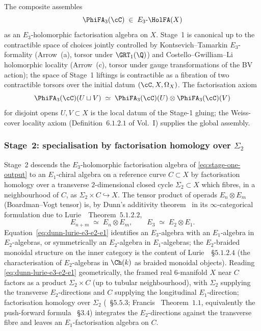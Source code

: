 The composite assembles
\begin{equation}
\label{eq:stage-one-output}
 \PhiFA_3(\cC) \;\in\; E_3\text{-}\HolFA(X)
\end{equation}
as an $E_3$-holomorphic factorisation algebra on $X$. Stage~1 is
canonical up to the contractible space of choices jointly controlled
by Kontsevich--Tamarkin $E_3$-formality (Arrow~(a), torsor under
$\GRT_1(\Q)$) and Costello--Gwilliam--Li holomorphic locality
(Arrow~(c), torsor under gauge transformations of the BV action); the
space of Stage~1 liftings is contractible as a fibration of two
contractible torsors over the initial datum $(\cC, X, \Omega_X)$. The
factorisation axiom
\begin{equation}
\label{eq:stage-one-factorisation}
 \PhiFA_3(\cC)(U \sqcup V) \;\simeq\;
 \PhiFA_3(\cC)(U) \otimes \PhiFA_3(\cC)(V)
\end{equation}
for disjoint opens $U, V \subset X$ is the local datum of the Stage-1
gluing; the Weiss-cover locality axiom (Definition~$6.1.2.1$ of
\cite{CostelloGwilliam} Vol.~I) supplies the global assembly.

\subsubsection{Stage~2: specialisation by factorisation homology over
$\Sigma_2$}
\label{subsec:fa-stage-two}

Stage~2 descends the $E_3$-holomorphic factorisation algebra of
\eqref{eq:stage-one-output} to an $E_1$-chiral algebra on a reference
curve $C \subset X$ by factorisation homology over a transverse
$2$-dimensional closed cycle $\Sigma_2 \subset X$ which fibres, in a
neighbourhood of $C$, as $\Sigma_2 \times C \hookrightarrow X$. The
tensor product of operads $E_n \otimes E_m$ (Boardman--Vogt tensor) is,
by Dunn's additivity theorem~\cite{Dunn1988} in its $\infty$-categorical
formulation due to Lurie~\cite{LurieHA}~Theorem~$5.1.2.2$,
\begin{equation}
\label{eq:dunn-lurie-e3-e2-e1}
 E_{n + m} \;\simeq\; E_n \otimes E_m,
 \qquad
 E_3 \;\simeq\; E_2 \otimes E_1.
\end{equation}
Equation~\eqref{eq:dunn-lurie-e3-e2-e1} identifies an $E_3$-algebra
with an $E_1$-algebra in $E_2$-algebras, or symmetrically an
$E_2$-algebra in $E_1$-algebras; the $E_2$-braided monoidal structure
on the inner category is the content of
Lurie~\cite{LurieHA}~\S$5.1.2.4$ (the characterisation of
$E_2$-algebras in $\Ch(k)$ as braided monoidal objects). Reading
\eqref{eq:dunn-lurie-e3-e2-e1} geometrically, the framed real
$6$-manifold $X$ near $C$ factors as a product $\Sigma_2 \times C$
(up to tubular neighbourhood), with $\Sigma_2$ supplying the transverse
$E_2$-directions and $C$ supplying the longitudinal $E_1$-direction;
factorisation homology over $\Sigma_2$
(\cite{LurieHA}~\S$5.5.3$; Francis~\cite{Francis2013} Theorem~$1.1$,
equivalently the push-forward formula \cite{Francis2013}~\S$3.4$)
integrates the $E_2$-directions against the transverse fibre and leaves
an $E_1$-factorisation algebra on $C$.

